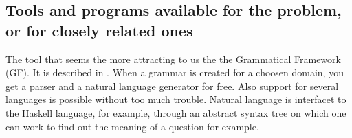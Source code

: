 \documentclass[a4paper,11pt]{article}
\begin{document}
\subsection{Tools and programs available for the problem, or for closely related ones}
The tool that seems the more attracting to us the the Grammatical Framework (GF). It
is described in \cite{ranta-2011}. When a grammar is created for a choosen domain,
you get a parser and a natural language generator for free. Also support for several
languages is possible without too much trouble. Natural language is interfacet to the
Haskell language, for example, through an abstract syntax tree on which one can work
to find out the meaning of a question for example.




\end{document}

